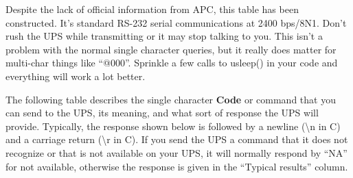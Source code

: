 {{{{{{{{{Despite the lack of official information from APC, this table has been
constructed. It's standard RS-232 serial communications at 2400 bps/8N1. Don't
rush the UPS while transmitting or it may stop talking to you. This isn't a
problem with the normal single character queries, but it really does matter
for multi-char things like ``@000''. Sprinkle a few calls to usleep() in your
code and everything will work a lot better.  

The following table describes the single character {\bf Code} or command that
you can send to the UPS, its meaning, and what sort of response the UPS will
provide. Typically, the response shown below is followed by a newline
(\textbackslash{}n in C) and a carriage return (\textbackslash{}r in C). If
you send the UPS a command that it does not recognize or that is not available
on your UPS, it will normally respond by ``NA'' for not available, otherwise
the response is given in the ``Typical results'' column. \gt{}  

}}}}}}}}}
